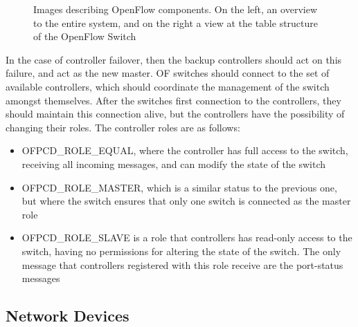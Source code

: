 \begin {enumerate}
\begin{figure} [h]
    \centering
    \begin{subfigure}
    \texttt{[image: sdn/open\_flow\_switch\_pipeline]}
    \end{subfigure}
    \begin{subfigure}
    \texttt{[image: sdn/open\_flow\_tables]}
    \end{subfigure}
    \caption{Images describing OpenFlow components. On the left, an overview to the entire system, and on the right a view at the table structure of the 
    OpenFlow Switch \cite{open_networking_foundation_openflow_2015}}
\end{figure}

\par In the case of controller failover, then the backup controllers should act on this failure, and act as the new master. OF switches should connect to the set of
available controllers, which should coordinate the management of the switch amongst themselves. After the switches first connection to the controllers, they should
maintain this connection alive, but the controllers have the possibility of changing their roles. The controller roles are as follows:

\begin {itemize}
    \item \textsc {OFPCD\_ROLE\_EQUAL}, where the controller has full access to the switch, receiving all incoming messages, and can modify the state of the switch
    \item \textsc {OFPCD\_ROLE\_MASTER}, which is a similar status to the previous one, but where the switch ensures that only one switch is connected as the master
        role
    \item \textsc {OFPCD\_ROLE\_SLAVE} is a role that controllers has read-only access to the switch, having no permissions for altering the state of the switch.
        The only message that controllers registered with this role receive are the port-status messages
\end {itemize}

\subsection {Network Devices}


\end{enumerate}
